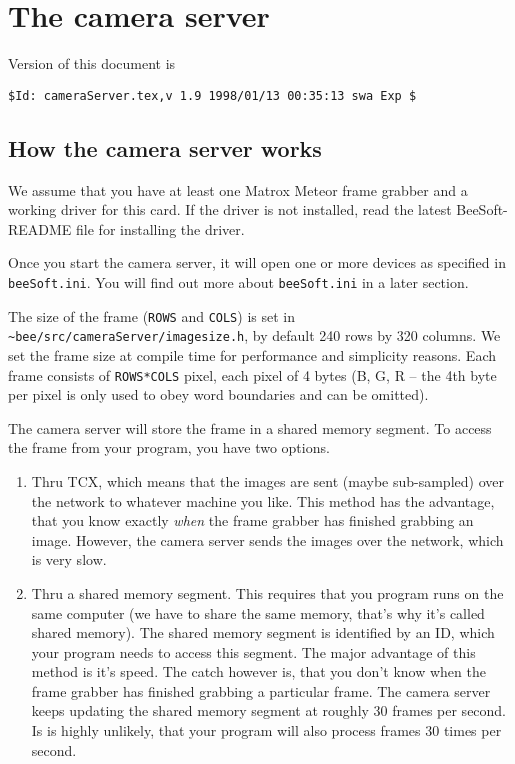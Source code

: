 \documentclass{article}
\begin{document}
\section{The camera server}

Version of this document is
\begin{verbatim}
$Id: cameraServer.tex,v 1.9 1998/01/13 00:35:13 swa Exp $
\end{verbatim}
 
\subsection{How the camera server works} 

We assume that you have at least one Matrox Meteor frame grabber and a working
driver for this card. If the driver is not installed, read the latest
BeeSoft-README file for installing the driver.
 
Once you start the camera server, it will open one or more devices as
specified in \texttt{beeSoft.ini}. You will find out more about
\texttt{beeSoft.ini} in a later section.
 
The size of the frame (\texttt{ROWS} and \texttt{COLS}) is set in
\texttt{\~{}bee/src/cameraServer/imagesize.h}, by default 240 rows by 320
columns. We set the frame size at compile time for performance and simplicity
reasons. Each frame consists of \texttt{ROWS*COLS} pixel, each pixel of 4
bytes (B, G, R -- the 4th byte per pixel is only used to obey word boundaries
and can be omitted).

The camera server will store the frame in a shared memory segment. To access
the frame from your program, you have two options.

\begin{enumerate}
  
\item Thru TCX, which means that the images are sent (maybe sub-sampled) over
  the network to whatever machine you like. This method has the advantage,
  that you know exactly \emph{when} the frame grabber has finished grabbing an
  image.  However, the camera server sends the images over the network, which
  is very slow.
  
\item Thru a shared memory segment. This requires that you program runs on the
  same computer (we have to share the same memory, that's why it's called
  shared memory). The shared memory segment is identified by an ID, which your
  program needs to access this segment. The major advantage of this method is
  it's speed. The catch however is, that you don't know when the frame grabber
  has finished grabbing a particular frame. The camera server keeps updating
  the shared memory segment at roughly 30 frames per second. Is is highly
  unlikely, that your program will also process frames 30 times per second.

\end{enumerate}
 
\end{document}
